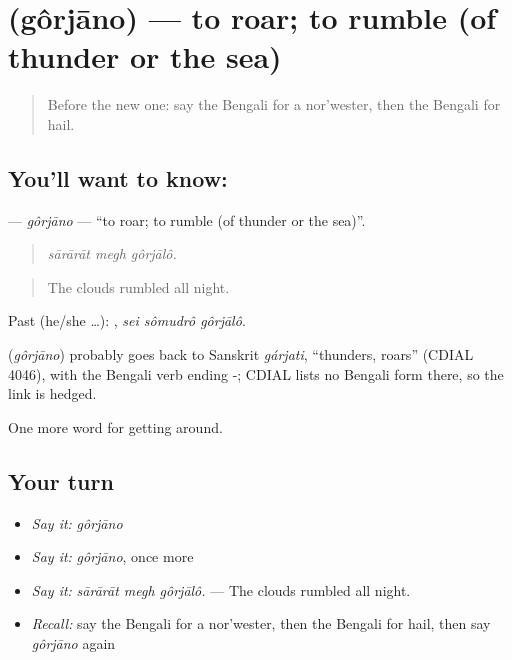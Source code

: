 \section[\texorpdfstring{\bn{গর্জানো} (gôrjāno)}{গর্জানো (gôrjāno)}]{ (gôrjāno) — to roar; to rumble (of thunder or the sea)}

\label{lesson:BN-C429-gorjano}



\begin{quote}
Before the new one: say the Bengali for a nor'wester, then the Bengali for hail.
\end{quote}

\subsection*{You'll want to know: }
\textbf{} — \emph{gôrjāno} — \textquotedblleft{}to roar; to rumble (of thunder or the sea)\textquotedblright{}.

\begin{quote}
  
\end{quote}

\begin{quote}
\emph{sārārāt megh gôrjālô.}
\end{quote}

\begin{quote}
The clouds rumbled all night.
\end{quote}

Past (he/she …):   , \emph{sei sômudrô gôrjālô}.

\begin{cousinweb}
\textbf{} (\emph{gôrjāno}) probably goes back to Sanskrit \emph{gárjati}, \textquotedblleft{}thunders, roars\textquotedblright{} (CDIAL 4046), with the Bengali verb ending -; CDIAL lists no Bengali form there, so the link is hedged.
\end{cousinweb}

\begin{grammarlens}[title={What you've built}]
One more word for getting around.
\end{grammarlens}

\subsection*{Your turn}
\begin{itemize}
\raggedright
  \item \emph{Say it:} \emph{gôrjāno}
  \item \emph{Say it:} \emph{gôrjāno}, once more
  \item \emph{Say it:} \emph{sārārāt megh gôrjālô.} — The clouds rumbled all night.
  \item \emph{Recall:} say the Bengali for a nor'wester, then the Bengali for hail, then say \emph{gôrjāno} again
\end{itemize}

